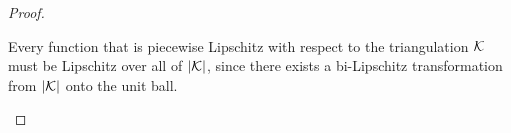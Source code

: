 \documentclass[10pt,a4paper]{article}
\newcommand{\mwl}[1]{{\color{red}#1}}
\begin{document}
\begin{proof}
\begin{itemize}
        Every function that is piecewise Lipschitz with respect to the triangulation ${\mathcal K}$ must be Lipschitz over all of $\left| {\mathcal K} \right|$, since there exists a bi-Lipschitz transformation from $\left| {\mathcal K} \right|$ onto the unit ball.
        

\end{itemize}
\end{proof}
\end{document}

